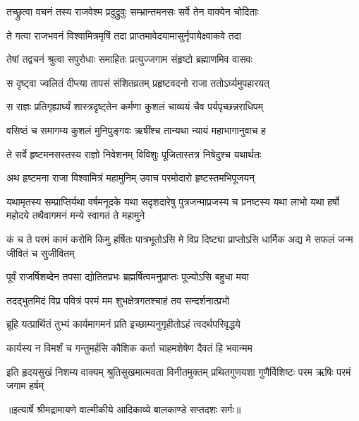 \twolineshloka
{तच्छ्रुत्वा वचनं तस्य राजवेश्म प्रदुद्रुवुः}
{सम्भ्रान्तमनसः सर्वे तेन वाक्येन चोदिताः} %

\twolineshloka
{ते गत्वा राजभवनं विश्वामित्रमृषिं तदा}
{प्राप्तमावेदयामासुर्नृपायेक्ष्वाकवे तदा} %

\twolineshloka
{तेषां तद्वचनं श्रुत्वा सपुरोधाः समाहितः}
{प्रत्युज्जगाम संहृष्टो ब्रह्माणमिव वासवः} %

\twolineshloka
{स दृष्ट्वा ज्वलितं दीप्त्या तापसं संशितव्रतम्}
{प्रहृष्टवदनो राजा ततोऽर्घ्यमुपहारयत्} %

\twolineshloka
{स राज्ञः प्रतिगृह्यार्घ्यं शास्त्रदृष्ट्तेन कर्मणा}
{कुशलं चाव्ययं चैव पर्यपृच्छन्नराधिपम्} %

\twolineshloka
{वसिष्ठं च समागम्य कुशलं मुनिपुङ्गवः}
{ऋषींश्च तान्यथा न्यायं महाभागानुवाच ह} %

\twolineshloka
{ते सर्वे हृष्टमनसस्तस्य राज्ञो निवेशनम्}
{विविशुः पूजितास्तत्र निषेदुश्च यथार्थतः} %

\twolineshloka
{अथ हृष्टमना राजा विश्वामित्रं महामुनिम्}
{उवाच परमोदारो हृष्टस्तमभिपूजयन्} %

\fourlineshloka
{यथामृतस्य सम्प्राप्तिर्यथा वर्षमनूदके}
{यथा सदृशदारेषु पुत्रजन्माप्रजस्य च}
{प्रनष्टस्य यथा लाभो यथा हर्षो महोदये}
{तथैवागमनं मन्ये स्वागतं ते महामुने} %

\threelineshloka
{कं च ते परमं कामं करोमि किमु हर्षितः}
{पात्रभूतोऽसि मे विप्र दिष्ट्या प्राप्तोऽसि धार्मिक}
{अद्य मे सफलं जन्म जीवितं च सुजीवितम्} %

\twolineshloka
{पूर्वं राजर्षिशब्देन तपसा द्योतितप्रभः}
{ब्रह्मर्षित्वमनुप्राप्तः पूज्योऽसि बहुधा मया} %

\twolineshloka
{तदद्भुतमिदं विप्र पवित्रं परमं मम}
{शुभक्षेत्रगतश्चाहं तव सन्दर्शनात्प्रभो} %

\twolineshloka
{ब्रूहि यत्प्रार्थितं तुभ्यं कार्यमागमनं प्रति}
{इच्छाम्यनुगृहीतोऽहं त्वदर्थपरिवृद्धये} %

\twolineshloka
{कार्यस्य न विमर्शं च गन्तुमर्हसि कौशिक}
{कर्ता चाहमशेषेण दैवतं हि भवान्मम} %

\fourlineindentedshloka
{इति हृदयसुखं निशम्य वाक्यम्}
{श्रुतिसुखमात्मवता विनीतमुक्तम्}
{प्रथितगुणयशा गुणैर्विशिष्टः}
{परम ऋषिः परमं जगाम हर्षम्} %


{॥इत्यार्षे श्रीमद्रामायणे वाल्मीकीये आदिकाव्ये बालकाण्डे सप्तदशः सर्गः॥}


